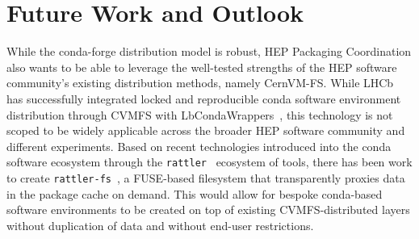 \section{Future Work and Outlook}\label{sec:conclusions}

While the conda-forge distribution model is robust, HEP Packaging Coordination also wants to be able to leverage the well-tested strengths of the HEP software community's existing distribution methods, namely CernVM-FS.
While LHCb has successfully integrated locked and reproducible conda software environment distribution through CVMFS with LbCondaWrappers~\cite{lbcondawrappers}, this technology is not scoped to be widely applicable across the broader HEP software community and different experiments.
Based on recent technologies introduced into the conda software ecosystem through the \texttt{rattler}~\cite{rattler} ecosystem of tools, there has been work to create \texttt{rattler-fs}~\cite{rattler_pr_1182}, a FUSE-based filesystem that transparently proxies data in the package cache on demand.
This would allow for bespoke conda-based software environments to be created on top of existing CVMFS-distributed layers without duplication of data and without end-user restrictions.
